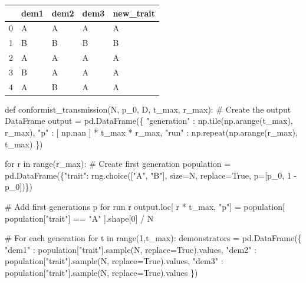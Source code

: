 \documentclass[
  a4paperpaper,
  ,captions=tableheading
]{scrbook}
\newenvironment{Shaded}{\begin{snugshade}}{\end{snugshade}}
\newcommand{\BuiltInTok}[1]{\textcolor[rgb]{0.00,0.23,0.31}{#1}}
\newcommand{\CommentTok}[1]{\textcolor[rgb]{0.37,0.37,0.37}{#1}}
\newcommand{\ControlFlowTok}[1]{\textcolor[rgb]{0.00,0.23,0.31}{#1}}
\newcommand{\DecValTok}[1]{\textcolor[rgb]{0.68,0.00,0.00}{#1}}
\newcommand{\KeywordTok}[1]{\textcolor[rgb]{0.00,0.23,0.31}{#1}}
\newcommand{\NormalTok}[1]{\textcolor[rgb]{0.00,0.23,0.31}{#1}}
\newcommand{\OperatorTok}[1]{\textcolor[rgb]{0.37,0.37,0.37}{#1}}
\newcommand{\StringTok}[1]{\textcolor[rgb]{0.13,0.47,0.30}{#1}}
\newcommand{\VariableTok}[1]{\textcolor[rgb]{0.07,0.07,0.07}{#1}}
\begin{document}
\begin{tabular}{lllll}
\toprule
{} & dem1 & dem2 & dem3 & new\_trait \\
\midrule
0 &    A &    A &    A &         A \\
1 &    B &    B &    B &         B \\
2 &    A &    A &    A &         A \\
3 &    B &    A &    A &         A \\
4 &    A &    B &    A &         A \\
\bottomrule
\end{tabular}

\begin{Shaded}
\begin{Highlighting}[]
\KeywordTok{def}\NormalTok{ conformist\_transmission(N, p\_0, D, t\_max, r\_max):}
    \CommentTok{\# Create the output DataFrame}
\NormalTok{    output }\OperatorTok{=}\NormalTok{ pd.DataFrame(\{}
        \StringTok{"generation"}\NormalTok{ : np.tile(np.arange(t\_max), r\_max),}
        \StringTok{"p"}\NormalTok{ : [ np.nan ] }\OperatorTok{*}\NormalTok{ t\_max }\OperatorTok{*}\NormalTok{ r\_max,}
        \StringTok{"run"}\NormalTok{ : np.repeat(np.arange(r\_max), t\_max)}
\NormalTok{    \})}

    \ControlFlowTok{for}\NormalTok{ r }\KeywordTok{in} \BuiltInTok{range}\NormalTok{(r\_max):}
        \CommentTok{\# Create first generation}
\NormalTok{        population }\OperatorTok{=}\NormalTok{ pd.DataFrame(\{}\StringTok{"trait"}\NormalTok{: rng.choice([}\StringTok{"A"}\NormalTok{, }\StringTok{"B"}\NormalTok{], size}\OperatorTok{=}\NormalTok{N, replace}\OperatorTok{=}\VariableTok{True}\NormalTok{, p}\OperatorTok{=}\NormalTok{[p\_0, }\DecValTok{1} \OperatorTok{{-}}\NormalTok{ p\_0])\})}

        \CommentTok{\# Add first generation\textquotesingle{}s p for run r}
\NormalTok{        output.loc[ r }\OperatorTok{*}\NormalTok{ t\_max, }\StringTok{"p"}\NormalTok{] }\OperatorTok{=}\NormalTok{ population[ population[}\StringTok{"trait"}\NormalTok{] }\OperatorTok{==} \StringTok{"A"}\NormalTok{ ].shape[}\DecValTok{0}\NormalTok{] }\OperatorTok{/}\NormalTok{ N}

        \CommentTok{\# For each generation }
        \ControlFlowTok{for}\NormalTok{ t }\KeywordTok{in} \BuiltInTok{range}\NormalTok{(}\DecValTok{1}\NormalTok{,t\_max):}
\NormalTok{            demonstrators }\OperatorTok{=}\NormalTok{ pd.DataFrame(\{}
                \StringTok{"dem1"}\NormalTok{ : population[}\StringTok{"trait"}\NormalTok{].sample(N, replace}\OperatorTok{=}\VariableTok{True}\NormalTok{).values,}
                \StringTok{"dem2"}\NormalTok{ : population[}\StringTok{"trait"}\NormalTok{].sample(N, replace}\OperatorTok{=}\VariableTok{True}\NormalTok{).values,}
                \StringTok{"dem3"}\NormalTok{ : population[}\StringTok{"trait"}\NormalTok{].sample(N, replace}\OperatorTok{=}\VariableTok{True}\NormalTok{).values}
\NormalTok{            \})}


\end{Highlighting}
\end{Shaded}
\end{document}

